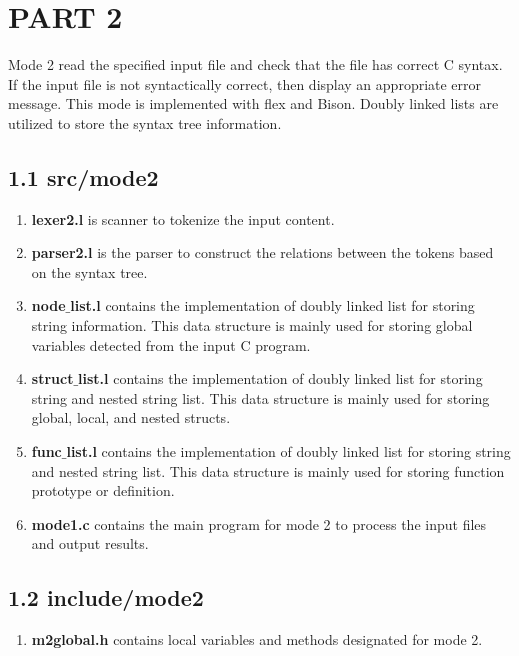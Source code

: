 \section*{PART 2}

Mode 2 read the specified input file and check that the file has correct C syntax. If the input file is not syntactically correct, then display an appropriate error message. This mode is implemented with flex and Bison. Doubly linked lists are utilized to store the syntax tree information.

\subsection*{1.1 \large\textbf{src/mode2}}
\begin{enumerate}
    \item \textbf{lexer2.l} is scanner to tokenize the input content.

    \item \textbf{parser2.l} is the parser to construct the relations between the tokens based on the syntax tree.

    \item \textbf{node$\_$list.l} contains the implementation of doubly linked list for storing string information. This data structure is mainly used for storing global variables detected from the input C program.
    
    \item \textbf{struct$\_$list.l} contains the implementation of doubly linked list for storing string and nested string list. This data structure is mainly used for storing global, local, and nested structs.

    \item \textbf{func$\_$list.l} contains the implementation of doubly linked list for storing string and nested string list. This data structure is mainly used for storing function prototype or definition.

    \item \textbf{mode1.c} contains the main program for mode 2 to process the input files and output results.
\end{enumerate}

\subsection*{1.2 \large\textbf{include/mode2}}
\begin{enumerate}
    \item \textbf{m2global.h} contains local variables and methods designated for mode 2.
\end{enumerate} 